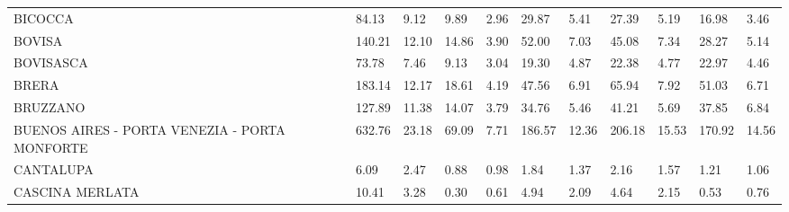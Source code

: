 \begin{table}[H]
{{\begin{tabular}{lp{1.3cm}p{1.3cm}p{1.3cm}p{1.3cm}p{1.3cm}p{1.3cm}p{1.3cm}p{1.3cm}p{1.3cm}p{1.3cm}}
BICOCCA                                            &                     84.13 &                  9.12 &                        9.89 &                    2.96 &                       29.87 &                    5.41 &                       27.39 &                    5.19 &                     16.98 &                  3.46 \\
BOVISA                                             &                    140.21 &                 12.10 &                       14.86 &                    3.90 &                       52.00 &                    7.03 &                       45.08 &                    7.34 &                     28.27 &                  5.14 \\
BOVISASCA                                          &                     73.78 &                  7.46 &                        9.13 &                    3.04 &                       19.30 &                    4.87 &                       22.38 &                    4.77 &                     22.97 &                  4.46 \\
BRERA                                              &                    183.14 &                 12.17 &                       18.61 &                    4.19 &                       47.56 &                    6.91 &                       65.94 &                    7.92 &                     51.03 &                  6.71 \\
BRUZZANO                                           &                    127.89 &                 11.38 &                       14.07 &                    3.79 &                       34.76 &                    5.46 &                       41.21 &                    5.69 &                     37.85 &                  6.84 \\
BUENOS AIRES - PORTA VENEZIA - PORTA MONFORTE      &                    632.76 &                 23.18 &                       69.09 &                    7.71 &                      186.57 &                   12.36 &                      206.18 &                   15.53 &                    170.92 &                 14.56 \\
CANTALUPA                                          &                      6.09 &                  2.47 &                        0.88 &                    0.98 &                        1.84 &                    1.37 &                        2.16 &                    1.57 &                      1.21 &                  1.06 \\
CASCINA MERLATA                                    &                     10.41 &                  3.28 &                        0.30 &                    0.61 &                        4.94 &                    2.09 &                        4.64 &                    2.15 &                      0.53 &                  0.76 \\

\end{tabular}}}
\end{table}

